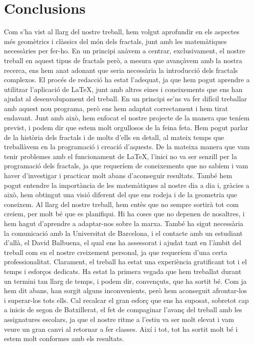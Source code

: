 \documentclass[12pt]{report}
\begin{document}
\section{Conclusions}
Com s'ha vist al llarg del nostre treball, hem volgut aprofundir en els aspectes més geomètrics i clàssics del món dels fractals, junt amb les matemàtiques necessàries per fer-ho. En un principi anàvem a centrar, exclusivament, el nostre treball en aquest tipus de fractals però, a mesura que avançàvem amb la nostra recerca, ens hem anat adonant que seria necessària la introducció dels fractals complexos.
\newline
\newline
El procés de redacció ha estat l'adequat, ja que hem pogut aprendre a utilitzar l'aplicació de LaTeX, junt amb altres eines i coneixements que ens han ajudat al desenvolupament del treball. En un principi se'ns va fer difícil treballar amb aquest nou programa, però ens hem adaptat correctament i hem tirat endavant. Junt amb això, hem enfocat el nostre projecte de la manera que teníem previst, i podem dir que estem molt orgullosos de la feina feta.
\newline
\newline
Hem pogut parlar de la història dels fractals i de molts d'ells en detall, al mateix temps que treballàvem en la programació i creació d'aquests. De la mateixa manera que vam tenir problemes amb el funcionament de LaTeX, l'inici no va ser senzill per la programació dels fractals, ja que requeríem de coneixements que no sabíem i vam haver d'investigar i practicar molt abans d'aconseguir resultats. També hem pogut entendre la importància de les matemàtiques al nostre dia a dia i, gràcies a això, hem obtingut una visió diferent del que ens rodeja i de la geometria que coneixem.
\newline
\newline
Al llarg del nostre treball, hem entès que no sempre sortirà tot com creiem, per molt bé que es planifiqui. Hi ha coses que no depenen de nosaltres, i hem hagut d'aprendre a adaptar-nos sobre la marxa. També ha sigut necessària la comunicació amb la Universitat de Barcelona, i el contacte amb un estudiant d'allà, el David Balbuena, el qual ens ha assessorat i ajudat tant en l'àmbit del treball com en el nostre creixement personal, ja que requeríem d'una certa professionalitat.
\newline
\newline
Clarament, el treball ha estat una experiència gratificant tot i el temps i esforços dedicats. Ha estat la primera vegada que hem treballat durant un termini tan llarg de temps, i podem dir, convençuts, que ha sortit bé. Com ja hem dit abans, han sorgit alguns inconvenients, però hem aconseguit afrontar-los i superar-los tots ells. Cal recalcar el gran esforç que ens ha suposat, sobretot cap a inicis de segon de Batxillerat, el fet de compaginar l'avanç del treball amb les assignatures escolars, ja que el nostre ritme a l'estiu va ser molt elevat i vam veure un gran canvi al retornar a fer classes. Així i tot, tot ha sortit molt bé i estem molt conformes amb els resultats.
\end{document}
